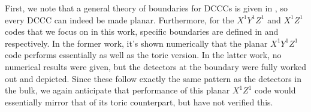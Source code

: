 First, we note that a general theory of boundaries for DCCCs is given in , so every DCCC can indeed be made planar. Furthermore, for the $X^1 Y^1 Z^1$ and $X^1 Z^1$ codes that we focus on in this work, specific boundaries are defined in  and  respectively. In the former work, it's shown numerically that the planar $X^1 Y^1 Z^1$ code performs essentially as well as the toric version. In the latter work, no numerical results were given, but the detectors at the boundary were fully worked out and depicted. Since these follow exactly the same pattern as the detectors in the bulk, we again anticipate that performance of this planar $X^1 Z^1$ code would essentially mirror that of its toric counterpart, but have not verified this.
